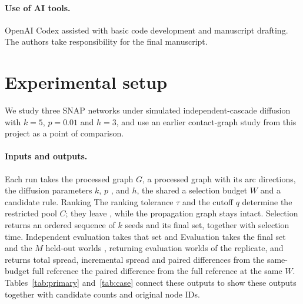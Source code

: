 \documentclass[smallextended]{svjour3}
\providecommand{\DIFaddtex}[1]{{\protect\color{blue} \sf #1}} %
\providecommand{\DIFdeltex}[1]{{\protect\color{red} \scriptsize #1}} %
\providecommand{\DIFaddbegin}{} %
\providecommand{\DIFaddend}{} %
\providecommand{\DIFdelbegin}{} %
\providecommand{\DIFdelend}{} %
\providecommand{\DIFadd}[1]{\texorpdfstring{\DIFaddtex{#1}}{#1}} %
\providecommand{\DIFdel}[1]{\texorpdfstring{\DIFdeltex{#1}}{}} %
\providecommand{\DIFscaledelfig}{0.5}
\newlength{\DIFdelgraphicswidth} %
\newlength{\DIFdelgraphicsheight} %
\providecommand{\DIFaddincludegraphics}[2][]{{\color{blue}\fbox{\DIFOincludegraphics[#1]{#2}}}} %
\providecommand{\DIFdelincludegraphics}[2][]{%
\sbox{\DIFdelgraphicsbox}{\DIFOincludegraphics[#1]{#2}}%
\settoboxwidth{\DIFdelgraphicswidth}{\DIFdelgraphicsbox} %
\settoboxtotalheight{\DIFdelgraphicsheight}{\DIFdelgraphicsbox} %
\scalebox{\DIFscaledelfig}{%
\parbox[b]{\DIFdelgraphicswidth}{\usebox{\DIFdelgraphicsbox}\\[-\baselineskip] \rule{\DIFdelgraphicswidth}{0em}}\llap{\resizebox{\DIFdelgraphicswidth}{\DIFdelgraphicsheight}{%
\setlength{\unitlength}{\DIFdelgraphicswidth}%
\begin{picture}(1,1)%
\thicklines\linethickness{2pt} %
{\color[rgb]{1,0,0}\put(0,0){\framebox(1,1){}}}%
{\color[rgb]{1,0,0}\put(0,0){\line( 1,1){1}}}%
{\color[rgb]{1,0,0}\put(0,1){\line(1,-1){1}}}%
\end{picture}%
}\hspace*{3pt}}} %
} %
\DeclareRobustCommand{\DIFaddbegin}{\DIFOaddbegin \let\includegraphics\DIFaddincludegraphics} %
\DeclareRobustCommand{\DIFaddend}{\DIFOaddend \let\includegraphics\DIFOincludegraphics} %
\DeclareRobustCommand{\DIFdelbegin}{\DIFOdelbegin \let\includegraphics\DIFdelincludegraphics} %
\DeclareRobustCommand{\DIFdelend}{\DIFOaddend \let\includegraphics\DIFOincludegraphics} %
\begin{document}
\DIFaddbegin \paragraph{\DIFadd{Use of AI tools.}} \DIFadd{OpenAI Codex assisted with basic code development and manuscript drafting. The authors take responsibility for the final manuscript.
}

\DIFaddend \section{Experimental setup}\label{sec:experimental-setup}
\DIFaddbegin \DIFadd{We study three SNAP networks under simulated independent-cascade diffusion with $k=5$, $p=0.01$ and $h=3$, and use an earlier contact-graph study from this project as a point of comparison.
}

\DIFaddend \paragraph{Inputs and outputs.} Each run takes \DIFdelbegin \DIFdel{the processed graph $G$, }\DIFdelend \DIFaddbegin \DIFadd{a processed graph with }\DIFaddend its arc directions, \DIFaddbegin \DIFadd{the diffusion parameters }\DIFaddend $k$, $p$ \DIFdelbegin \DIFdel{, }\DIFdelend \DIFaddbegin \DIFadd{and }\DIFaddend $h$, \DIFdelbegin \DIFdel{the shared }\DIFdelend \DIFaddbegin \DIFadd{a }\DIFaddend selection budget $W$ and a candidate rule. \DIFdelbegin \DIFdel{Ranking }\DIFdelend \DIFaddbegin \DIFadd{The ranking }\DIFaddend tolerance $\tau$ and \DIFaddbegin \DIFadd{the }\DIFaddend cutoff $q$ determine the restricted pool\DIFdelbegin \DIFdel{$C$; they leave }\DIFdelend \DIFaddbegin \DIFadd{, while }\DIFaddend the propagation graph \DIFaddbegin \DIFadd{stays }\DIFaddend intact. Selection returns an ordered sequence of $k$ seeds and its \DIFdelbegin \DIFdel{final set, together with }\DIFdelend selection time. \DIFdelbegin \DIFdel{Independent evaluation takes that set and }\DIFdelend \DIFaddbegin \DIFadd{Evaluation takes the final set and the }\DIFaddend $M$ \DIFdelbegin \DIFdel{held-out worlds , returning }\DIFdelend \DIFaddbegin \DIFadd{evaluation worlds of the replicate, and returns }\DIFaddend total spread, incremental spread and \DIFdelbegin \DIFdel{paired differences from the same-budget full reference }\DIFdelend \DIFaddbegin \DIFadd{the paired difference from the full reference at the same $W$}\DIFaddend . Tables~\ref{tab:primary} and~\ref{tab:case} \DIFdelbegin \DIFdel{connect these outputs to }\DIFdelend \DIFaddbegin \DIFadd{show these outputs together with }\DIFaddend candidate counts and original node IDs.
\end{document}
